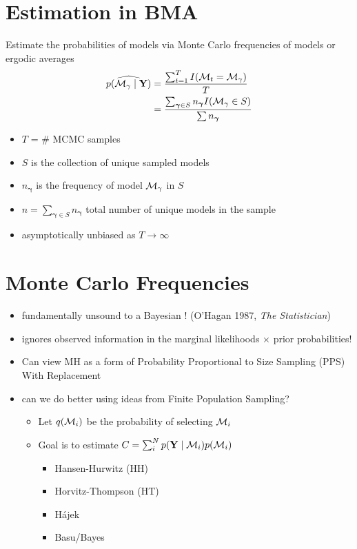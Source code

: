 \documentclass[
]{report}
\providecommand{\tightlist}{%
  \setlength{\itemsep}{0pt}\setlength{\parskip}{0pt}}\usepackage{longtable,booktabs,array}
\newcommand{\1}{\mathbf{1}_n}
\newcommand{\Y}{\mathbf{Y}}
\def\M{{{\cal M}}}
\def\Mg{{\boldsymbol{{\cal M}_\gamma}}}
\def\g{\boldsymbol{\gamma}}
\def\Mg{{\cal M}_\gamma}
\begin{document}
\section{Estimation in BMA}\label{estimation-in-bma}

Estimate the probabilities of models via Monte Carlo frequencies of
models or ergodic averages \begin{align*} 
\widehat{p(\Mg \mid \Y)}  & = \frac{\sum_{t = 1}^T I(\M_t = \Mg)} {T} \\
 & = \frac{\sum_{\g \in S} n_{\g} I(\Mg \in S)} {\sum n_{\g}} \\
\end{align*}

\begin{itemize}
\item
  \(T\) = \# MCMC samples
\item
  \(S\) is the collection of unique sampled models
\item
  \(n_{\g}\) is the frequency of model \(\Mg\) in \(S\)
\item
  \(n = \sum_{\g \in S} n_{\g}\) total number of unique models in the
  sample
\item
  asymptotically unbiased as \(T \to \infty\)
\end{itemize}

\section{Monte Carlo Frequencies}\label{monte-carlo-frequencies}

\begin{itemize}
\item
  fundamentally unsound to a Bayesian ! (O'Hagan 1987, \emph{The
  Statistician})
\item
  ignores observed information in the marginal likelihoods \(\times\)
  prior probabilities!
\item
  Can view MH as a form of Probability Proportional to Size Sampling
  (PPS) With Replacement
\item
  can we do better using ideas from Finite Population Sampling?

  \begin{itemize}
  \item
    Let \(q(\M_i)\) be the probability of selecting \(\M_i\)
  \item
    Goal is to estimate \(C= \sum_i^N p(\Y \mid \M_i) p(\M_i)\)

    \begin{itemize}
    \tightlist
    \item
      Hansen-Hurwitz (HH)
    \item
      Horvitz-Thompson (HT)
    \item
      Hájek
    \item
      Basu/Bayes
    \end{itemize}
  \end{itemize}
\end{itemize}
\end{document}
